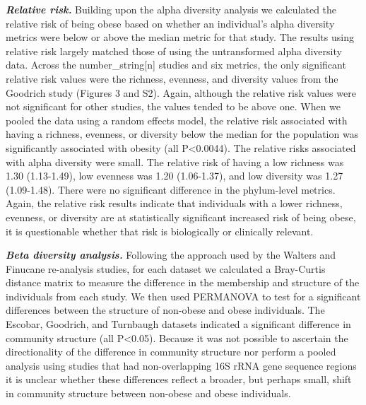 \documentclass[12pt,]{article}
\begin{document}
\textbf{\emph{Relative risk.}} Building upon the alpha diversity
analysis we calculated the relative risk of being obese based on whether
an individual's alpha diversity metrics were below or above the median
metric for that study. The results using relative risk largely matched
those of using the untransformed alpha diversity data. Across the
number\_string{[}n{]} studies and six metrics, the only significant
relative risk values were the richness, evenness, and diversity values
from the Goodrich study (Figures 3 and S2). Again, although the relative
risk values were not significant for other studies, the values tended to
be above one. When we pooled the data using a random effects model, the
relative risk associated with having a richness, evenness, or diversity
below the median for the population was significantly associated with
obesity (all P\textless{}0.0044). The relative risks associated with
alpha diversity were small. The relative risk of having a low richness
was 1.30 (1.13-1.49), low evenness was 1.20 (1.06-1.37), and low
diversity was 1.27 (1.09-1.48). There were no significant difference in
the phylum-level metrics. Again, the relative risk results indicate that
individuals with a lower richness, evenness, or diversity are at
statistically significant increased risk of being obese, it is
questionable whether that risk is biologically or clinically relevant.

\textbf{\emph{Beta diversity analysis.}} Following the approach used by
the Walters and Finucane re-analysis studies, for each dataset we
calculated a Bray-Curtis distance matrix to measure the difference in
the membership and structure of the individuals from each study. We then
used PERMANOVA to test for a significant differences between the
structure of non-obese and obese individuals. The Escobar, Goodrich, and
Turnbaugh datasets indicated a significant difference in community
structure (all P\textless{}0.05). Because it was not possible to
ascertain the directionality of the difference in community structure
nor perform a pooled analysis using studies that had non-overlapping 16S
rRNA gene sequence regions it is unclear whether these differences
reflect a broader, but perhaps small, shift in community structure
between non-obese and obese individuals.
\end{document}
